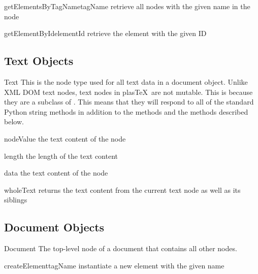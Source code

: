 \documentclass{manual}
\newcommand{\plasTeX}{plas\TeX}
\begin{document}
\begin{methoddesc}[Element]{getElementsByTagName}{tagName}
retrieve all nodes with the given name in the node
\end{methoddesc}

\begin{methoddesc}[Element]{getElementById}{elementId}
retrieve the element with the given ID
\end{methoddesc}


\subsection{Text Objects}

\begin{classdesc}{Text}{}
This is the node type used for all text data in a document object.
Unlike XML DOM text nodes, text nodes in \plasTeX\ are 
not mutable.  This is because they are a subclass of .
This means that they will respond to all of the standard Python
string methods in addition to the  methods and the methods
described below.
\end{classdesc}

\begin{memberdesc}[Text]{nodeValue}
the text content of the node
\end{memberdesc}

\begin{memberdesc}[Text]{length}
the length of the text content
\end{memberdesc}

\begin{memberdesc}[Text]{data}
the text content of the node
\end{memberdesc}

\begin{memberdesc}[Text]{wholeText}
returns the text content from the current text node as well as its siblings
\end{memberdesc}


\subsection{Document Objects}

\begin{classdesc}{Document}{}
The top-level node of a document that contains all other nodes.
\end{classdesc}

\begin{methoddesc}[Document]{createElement}{tagName}
instantiate a new element with the given name
\end{methoddesc}
\end{document}
